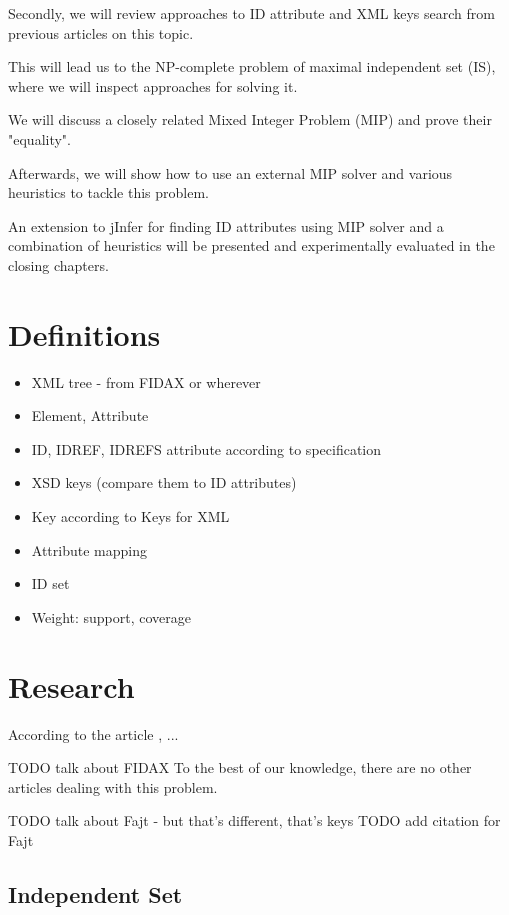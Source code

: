 \documentclass[a4paper,12pt,oneside]{report}
\begin{document}
Secondly, we will review approaches to ID attribute and XML keys search from previous articles on this topic. 

This will lead us to the NP-complete problem of maximal independent set (IS), where we will inspect approaches for solving it.

We will discuss a closely related Mixed Integer Problem (MIP) and prove their "equality".

Afterwards, we will show how to use an external MIP solver and various heuristics to tackle this problem.

An extension to jInfer for finding ID attributes using MIP solver and a combination of heuristics will be presented and experimentally evaluated in the closing chapters.

\chapter{Definitions}

\begin{itemize}
	\item XML tree - from FIDAX or wherever
	\item Element, Attribute
	\item ID, IDREF, IDREFS attribute according to specification
	\item XSD keys (compare them to ID attributes)
	\item Key according to Keys for XML \cite{keX}
	\item Attribute mapping 
	\item ID set
  \item Weight: support, coverage
\end{itemize}

\chapter{Research}

According to the article \cite{fidax}, ...

TODO talk about FIDAX
To the best of our knowledge, there are no other articles dealing with this problem. 

TODO talk about Fajt - but that's different, that's keys
TODO add citation for Fajt

\section{Independent Set}
\end{document}
